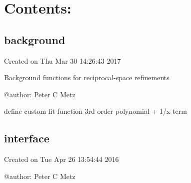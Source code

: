 \documentclass[letterpaper,10pt,english]{sphinxmanual}
\begin{document}
\chapter{Contents:}
\label{\detokenize{index:contents}}

\section{background}
\label{\detokenize{rst/background:module-mstack.background}}\label{\detokenize{rst/background::doc}}\label{\detokenize{rst/background:background}}
Created on Thu Mar 30 14:26:43 2017

Background functions for reciprocal-space refinements

@author: Peter C Metz

\begin{fulllineitems}
\label{\detokenize{rst/background:mstack.background.inv_x_plus_poly3}}
define custom fit function 3rd order polynomial + 1/x term

\end{fulllineitems}



\section{interface}
\label{\detokenize{rst/interface:interface}}\label{\detokenize{rst/interface::doc}}\label{\detokenize{rst/interface:module-mstack.interface}}
Created on Tue Apr 26 13:54:44 2016

@author: Peter C Metz
\end{document}
